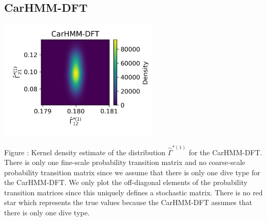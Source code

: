\documentclass{article}
\begin{document}
        \newpage
        \subsection{CarHMM-DFT}
        \begin{center}
        \includegraphics[width=3in]{../Plots/hmm_FV_Gamma_density_0.png}
        \end{center}
        
        \noindent Figure : Kernel density estimate of the distribution $\hat \Gamma^{*(1)}$ for the CarHMM-DFT. There is only one fine-scale probability transition matrix and no coarse-scale probability transition matrix since we assume that there is only one dive type for the CarHMM-DFT. We only plot the off-diagonal elements of the probability transition matrices since this uniquely defines a stochastic matrix. There is no red star which represents the true values because the CarHMM-DFT assumes that there is only one dive type.
        \addtocounter{fignum}{1}
\fi
\end{document}
